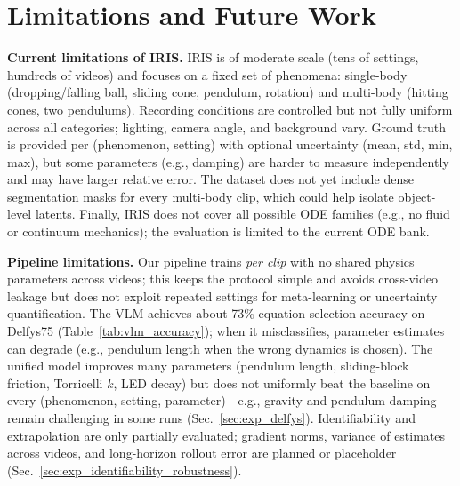 


\section{Limitations and Future Work}
\label{sec:limitations}

\textbf{Current limitations of IRIS.} IRIS is of moderate scale (tens of settings, hundreds of videos) and focuses on a fixed set of phenomena: single-body (dropping/falling ball, sliding cone, pendulum, rotation) and multi-body (hitting cones, two pendulums). Recording conditions are controlled but not fully uniform across all categories; lighting, camera angle, and background vary. Ground truth is provided per (phenomenon, setting) with optional uncertainty (mean, std, min, max), but some parameters (e.g., damping) are harder to measure independently and may have larger relative error. The dataset does not yet include dense segmentation masks for every multi-body clip, which could help isolate object-level latents. Finally, IRIS does not cover all possible ODE families (e.g., no fluid or continuum mechanics); the evaluation is limited to the current ODE bank.

\textbf{Pipeline limitations.} Our pipeline trains \emph{per clip} with no shared physics parameters across videos; this keeps the protocol simple and avoids cross-video leakage but does not exploit repeated settings for meta-learning or uncertainty quantification. The VLM achieves about 73\% equation-selection accuracy on Delfys75 (Table~\ref{tab:vlm_accuracy}); when it misclassifies, parameter estimates can degrade (e.g., pendulum length when the wrong dynamics is chosen). The unified model improves many parameters (pendulum length, sliding-block friction, Torricelli $k$, LED decay) but does not uniformly beat the baseline on every (phenomenon, setting, parameter)—e.g., gravity and pendulum damping remain challenging in some runs (Sec.~\ref{sec:exp_delfys}). Identifiability and extrapolation are only partially evaluated; gradient norms, variance of estimates across videos, and long-horizon rollout error are planned or placeholder (Sec.~\ref{sec:exp_identifiability_robustness}).

